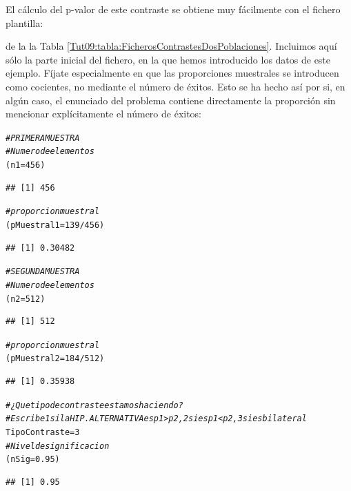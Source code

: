 \documentclass[10pt,a4paper]{article}\usepackage[]{graphicx}\usepackage[]{color}
\makeatletter
\newcommand{\hlnum}[1]{\textcolor[rgb]{0.686,0.059,0.569}{#1}}%
\newcommand{\hlcom}[1]{\textcolor[rgb]{0.678,0.584,0.686}{\textit{#1}}}%
\newcommand{\hlopt}[1]{\textcolor[rgb]{0,0,0}{#1}}%
\newcommand{\hlstd}[1]{\textcolor[rgb]{0.345,0.345,0.345}{#1}}%
\newcommand{\hlkwb}[1]{\textcolor[rgb]{0.69,0.353,0.396}{#1}}%
\newenvironment{kframe}{%
 \def\at@end@of@kframe{}%
 \ifinner\ifhmode%
  \def\at@end@of@kframe{\end{minipage}}%
  \begin{minipage}{\columnwidth}%
 \fi\fi%
 \def\FrameCommand##1{\hskip\@totalleftmargin \hskip-\fboxsep
 \colorbox{shadecolor}{##1}\hskip-\fboxsep
     \hskip-\linewidth \hskip-\@totalleftmargin \hskip\columnwidth}%
 \MakeFramed {\advance\hsize-\width
   \@totalleftmargin\z@ \linewidth\hsize
   \@setminipage}}%
 {\par\unskip\endMakeFramed%
 \at@end@of@kframe}
\newenvironment{knitrout}{}{} %
\newcounter {cont01}
\makeatother
\begin{document}
El cálculo del p-valor de este contraste se obtiene muy fácilmente con el fichero plantilla:
\begin{center}
\end{center}
de la la Tabla \ref{Tut09:tabla:FicherosContrastesDosPoblaciones}. Incluimos aquí sólo la parte inicial del fichero, en la que hemos introducido los datos de este ejemplo. Fíjate especialmente en que las proporciones muestrales se introducen como cocientes, no mediante el número de éxitos. Esto se ha hecho así por si, en algún caso, el enunciado del problema contiene directamente la proporción sin mencionar explícitamente el número de éxitos:

\begin{knitrout}
\color{fgcolor}\begin{kframe}
\begin{alltt}
\hlcom{# PRIMERA MUESTRA}
\hlcom{# Numero de elementos}
\hlstd{(n1} \hlkwb{=} \hlnum{456}\hlstd{)}
\end{alltt}
\begin{verbatim}
## [1] 456
\end{verbatim}
\begin{alltt}
\hlcom{# proporcion muestral}
\hlstd{(pMuestral1} \hlkwb{=} \hlnum{139}\hlopt{/}\hlnum{456}\hlstd{)}
\end{alltt}
\begin{verbatim}
## [1] 0.30482
\end{verbatim}
\begin{alltt}
\hlcom{# SEGUNDA MUESTRA}
\hlcom{# Numero de elementos}
\hlstd{(n2} \hlkwb{=}  \hlnum{512}\hlstd{)}
\end{alltt}
\begin{verbatim}
## [1] 512
\end{verbatim}
\begin{alltt}
\hlcom{# proporcion muestral}
\hlstd{(pMuestral2} \hlkwb{=} \hlnum{184}\hlopt{/}\hlnum{512}\hlstd{)}
\end{alltt}
\begin{verbatim}
## [1] 0.35938
\end{verbatim}
\begin{alltt}
\hlcom{# ¿Que tipo de contraste estamos haciendo?}
\hlcom{# Escribe 1 si la HIP. ALTERNATIVA es p1 > p2, 2 si es p1 < p2, 3 si es bilateral}
\hlstd{TipoContraste} \hlkwb{=} \hlnum{3}
  \hlcom{#Nivel de significacion}
  \hlstd{(nSig} \hlkwb{=} \hlnum{0.95}\hlstd{)}
\end{alltt}
\begin{verbatim}
## [1] 0.95
\end{verbatim}
\end{kframe}
\end{knitrout}
\end{document}
